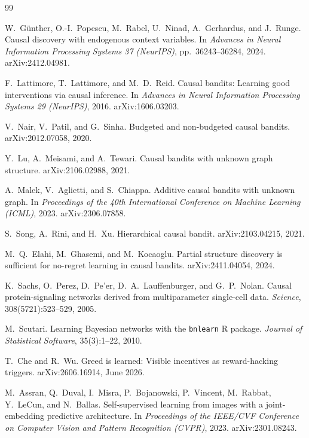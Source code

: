 \documentclass[11pt]{article}
\newcommand{\code}[1]{\texttt{\small #1}}
\begin{document}
\begin{thebibliography}{99}

W.~G\"unther, O.-I.~Popescu, M.~Rabel, U.~Ninad, A.~Gerhardus, and J.~Runge.
\newblock Causal discovery with endogenous context variables.
\newblock In \emph{Advances in Neural Information Processing Systems 37 (NeurIPS)},
pp.~36243--36284, 2024. arXiv:2412.04981.

F.~Lattimore, T.~Lattimore, and M.~D.~Reid.
\newblock Causal bandits: Learning good interventions via causal inference.
\newblock In \emph{Advances in Neural Information Processing Systems 29 (NeurIPS)},
2016. arXiv:1606.03203.

V.~Nair, V.~Patil, and G.~Sinha.
\newblock Budgeted and non-budgeted causal bandits.
\newblock arXiv:2012.07058, 2020.

Y.~Lu, A.~Meisami, and A.~Tewari.
\newblock Causal bandits with unknown graph structure.
\newblock arXiv:2106.02988, 2021.

A.~Malek, V.~Aglietti, and S.~Chiappa.
\newblock Additive causal bandits with unknown graph.
\newblock In \emph{Proceedings of the 40th International Conference on Machine
Learning (ICML)}, 2023. arXiv:2306.07858.

S.~Song, A.~Rini, and H.~Xu.
\newblock Hierarchical causal bandit.
\newblock arXiv:2103.04215, 2021.

M.~Q.~Elahi, M.~Ghasemi, and M.~Kocaoglu.
\newblock Partial structure discovery is sufficient for no-regret learning in causal
bandits.
\newblock arXiv:2411.04054, 2024.

K.~Sachs, O.~Perez, D.~Pe'er, D.~A.~Lauffenburger, and G.~P.~Nolan.
\newblock Causal protein-signaling networks derived from multiparameter
single-cell data.
\newblock \emph{Science}, 308(5721):523--529, 2005.

M.~Scutari.
\newblock Learning Bayesian networks with the \code{bnlearn} R package.
\newblock \emph{Journal of Statistical Software}, 35(3):1--22, 2010.

T.~Che and R.~Wu.
\newblock Greed is learned: Visible incentives as reward-hacking triggers.
\newblock arXiv:2606.16914, June 2026.

M.~Assran, Q.~Duval, I.~Misra, P.~Bojanowski, P.~Vincent, M.~Rabbat, Y.~LeCun, and
N.~Ballas.
\newblock Self-supervised learning from images with a joint-embedding predictive
architecture.
\newblock In \emph{Proceedings of the IEEE/CVF Conference on Computer Vision and
Pattern Recognition (CVPR)}, 2023. arXiv:2301.08243.


\end{thebibliography}
\end{document}

